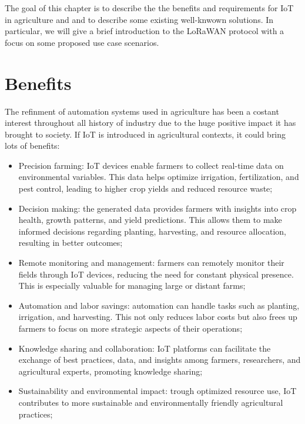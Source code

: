 

The goal of this chapter is to describe the the benefits and requirements for \gls{IoT} in agriculture and and to
describe some existing well-knwown solutions. In particular, we will give a brief introduction to the \gls{LoRaWAN}
protocol with a focus on some proposed use case scenarios.


\section{Benefits}
\label{sec: benefits}
The refinment of automation systems used in agriculture has been a costant interest throughout all history of
industry due to the huge positive impact it has brought to society. If \gls{IoT} is introduced
in agricultural contexts, it could bring lots of benefits:
\begin{itemize}
    \item Precision farming: IoT devices enable farmers to collect real-time data on environmental variables. This data
        helps optimize irrigation, fertilization, and pest control, leading to higher crop yields and reduced resource
        waste;
    \item Decision making: the generated data provides farmers with insights into crop health, growth
        patterns, and yield predictions. This allows them to make informed decisions regarding planting, harvesting, and
        resource allocation, resulting in better outcomes;
    \item Remote monitoring and management: farmers can remotely monitor their fields through IoT devices,
        reducing the need for constant physical presence. This is especially valuable for managing large or distant farms;
    \item Automation and labor savings: automation can handle tasks such as planting, irrigation, and
        harvesting. This not only reduces labor costs but also frees up farmers to focus on more strategic aspects of
        their operations;
    \item Knowledge sharing and collaboration: IoT platforms can facilitate the exchange of best practices, data, and
        insights among farmers, researchers, and agricultural experts, promoting knowledge sharing;
    \item Sustainability and environmental impact: trough optimized resource use, IoT contributes to more sustainable
        and environmentally friendly agricultural practices;
\end{itemize}


